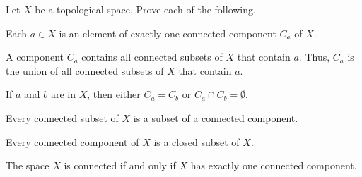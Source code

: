 \ea


\begin{comment}

\ExerciseSolution

\ba

\item If $A$ is a single point set, then $A' = \emptyset$, which is connected. So assume that $A$ contains more than just one point. First we demonstrate that every point of $A$ is a limit point of $A$. Let $a \in A$. Proceed by contradiction and assume that $a$ is not a limit point of $A$. Then there is an open set $U$ containing $a$ with $U \cap A = \{a\}$. Let $V = X \setminus \{a\}$. Since $X$ is Hausdorff, $\{a\}$ is closed. So $V$ is open. Also, $V \cap A \neq \emptyset$, $U \cap A \neq \emptyset$, and $U \cap V \cap A = \emptyset$. So $U$ and $V$ form a separation of $A$. But this is impossible if $A$ is connected. We conclude that every point of $A$ is a limit point of $A$. Then $\overline{A} = A \cup A' = A'$, which is connected.


\item Exercise \ref{ex:particular_point_connected} shows that the nonempty connected subsets of $(\R, \tau_0)$ are the subsets that contain $0$. So $\Z$ is connected. Now we determine $\Z'$. Let $x \in \R$ with $x \neq 0$. Every open set in $(\R, \tau_0)$ contains $0$, so every open set that contains $x$ also contains a point in $\Z$ that is different from $x$. Thus, every number except $0$ is in $\Z'$. However, the open set $\{0\}$ does not contain any points in $\Z$ different from $0$, so $0 \notin \Z'$. Since $\Z'$ does not contain $0$, we conclude that $\Z'$ is not connected. 

\ea

\end{comment}



\item Let $X$ be a topological space. Prove each of the following.
\ba
\item Each $a \in X$ is an element of exactly one connected component $C_a$ of $X$.
\item A component $C_a$ contains all connected subsets of $X$ that contain $a$. Thus, $C_a$ is the union of all connected subsets of $X$ that contain $a$. 
\item If $a$ and $b$ are in $X$, then either $C_a = C_b$ or $C_a \cap C_b = \emptyset$. 
\item Every connected subset of $X$ is a subset of a connected component.
\item Every connected component of $X$ is a closed subset of $X$.
\item The space $X$ is connected if and only if $X$ has exactly one connected component.
\ea

